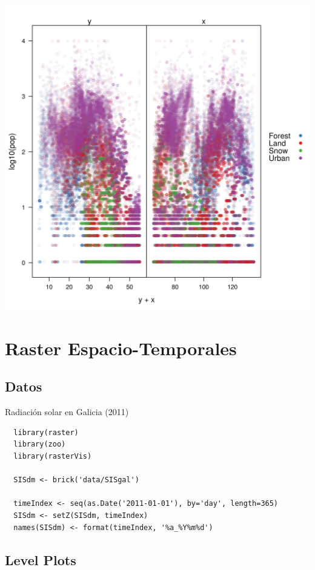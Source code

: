 \documentclass[xcolor={usenames,svgnames,dvipsnames}]{beamer}
\begin{document}
\begin{frame}[label=sec-3-3-8]{}
\includegraphics[width=.9\linewidth]{figs/xyplotLandClass.png}
\end{frame}

\section{Raster Espacio-Temporales}
\label{sec-4}

\subsection{Datos}
\label{sec-4-1}

\begin{frame}[fragile,label=sec-4-1-1]{Radiación solar en Galicia (2011)}
 \lstset{language=R,label= ,caption= ,numbers=none}
\begin{lstlisting}
  library(raster)
  library(zoo)
  library(rasterVis)
  
  SISdm <- brick('data/SISgal')
  
  timeIndex <- seq(as.Date('2011-01-01'), by='day', length=365)
  SISdm <- setZ(SISdm, timeIndex)
  names(SISdm) <- format(timeIndex, '%a_%Y%m%d')
\end{lstlisting}
\end{frame}


\subsection{Level Plots}
\label{sec-4-2}
\end{document}
